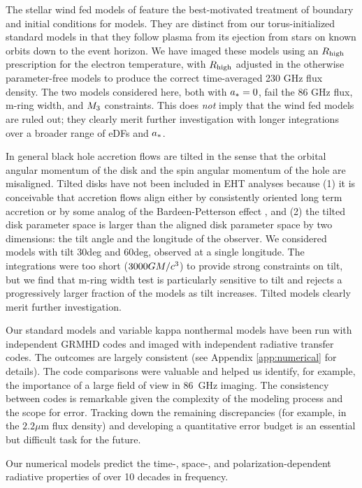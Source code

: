 The stellar wind fed models of \cite{2020ApJ...896L...6R} feature the best-motivated treatment of boundary and initial conditions for \sgra models.  They are distinct from our torus-initialized standard models in that they follow plasma from its ejection from stars on known orbits down to the event horizon.  We have imaged these models using an $R_\mathrm{high}$ prescription for the electron temperature, with $R_\mathrm{high}$ adjusted in the otherwise parameter-free models to produce the correct time-averaged 230 GHz flux density.  The two models considered here, both with $a_* = 0$, fail the $86$ GHz flux, m-ring width, and $M_{3}$ constraints.  This does {\em not} imply that the wind fed models are ruled out; they clearly merit further investigation with longer integrations over a broader range of eDFs and $a_*$.  

In general black hole accretion flows are tilted in the sense that the orbital angular momentum of the disk and the spin angular momentum of the hole are misaligned.  Tilted disks have not been included in EHT analyses because (1) it is conceivable that accretion flows align either by consistently oriented long term accretion or by some analog of the Bardeen-Petterson effect \citep{1975ApJ...195L..65B}, and (2) the tilted disk parameter space is larger than the aligned disk parameter space by two dimensions: the tilt angle and the longitude of the observer.  We considered models with tilt $30$deg and $60$deg, observed at a single longitude.  The integrations were too short ($3000 GM/c^3$) to provide strong constraints on tilt, but we find that m-ring width test is particularly sensitive to tilt and rejects a progressively larger fraction of the models as tilt increases.  Tilted models clearly merit further investigation.  

Our standard models and variable kappa nonthermal models have been run with independent GRMHD codes and imaged with independent radiative transfer codes.  The outcomes are largely consistent (see Appendix \ref{app:numerical} for details).  The code comparisons were valuable and helped us identify, for example, the importance of a large field of view in 86~GHz imaging.  The consistency between codes is remarkable given the complexity of the modeling process and the scope for error.  Tracking down the remaining discrepancies (for example, in the $2.2\mu$m flux density) and developing a quantitative error budget is an essential but difficult task for the future.   

Our numerical models predict the time-, space-, and polarization-dependent radiative properties of \sgra over 10 decades in frequency.  

